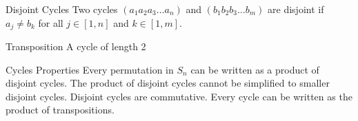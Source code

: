 \begin{flashcard}[Definition]{Disjoint Cycles}
  Two cycles $(a_1 a_2 a_3 \dots a_n)$ and $(b_1 b_2 b_3 \dots b_m)$ are disjoint if $a_j \neq b_k$ for all $j \in [1,n]$ and $k \in [1,m]$.
\end{flashcard}

\begin{flashcard}[Definition]{Transposition}
  A cycle of length 2
\end{flashcard}

\begin{flashcard}[Definition]{Cycles Properties}
  Every permutation in $S_n$ can be written as a product of disjoint cycles.
  \vfill
  The product of disjoint cycles cannot be simplified to smaller disjoint cycles.
  \vfill
  Disjoint cycles are commutative.
  \vfill
  Every cycle can be written as the product of transpositions.
\end{flashcard}
